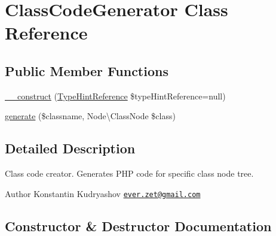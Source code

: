 \hypertarget{class_prophecy_1_1_doubler_1_1_generator_1_1_class_code_generator}{}\section{Class\+Code\+Generator Class Reference}
\label{class_prophecy_1_1_doubler_1_1_generator_1_1_class_code_generator}
\subsection*{Public Member Functions}
\begin{DoxyCompactItemize}
\item 
\mbox{\hyperlink{class_prophecy_1_1_doubler_1_1_generator_1_1_class_code_generator_a7af58487a662e4cd0100a7898f19dace}{\+\_\+\+\_\+construct}} (\mbox{\hyperlink{class_prophecy_1_1_doubler_1_1_generator_1_1_type_hint_reference}{Type\+Hint\+Reference}} \$type\+Hint\+Reference=null)
\item 
\mbox{\hyperlink{class_prophecy_1_1_doubler_1_1_generator_1_1_class_code_generator_ab1815384758d5968946463c819e881ab}{generate}} (\$classname, Node\textbackslash{}\+Class\+Node \$class)
\end{DoxyCompactItemize}


\subsection{Detailed Description}
Class code creator. Generates P\+HP code for specific class node tree.

\begin{DoxyAuthor}{Author}
Konstantin Kudryashov \href{mailto:ever.zet@gmail.com}{\tt ever.\+zet@gmail.\+com} 
\end{DoxyAuthor}


\subsection{Constructor \& Destructor Documentation}
\mbox{\label{class_prophecy_1_1_doubler_1_1_generator_1_1_class_code_generator_a7af58487a662e4cd0100a7898f19dace}} 
